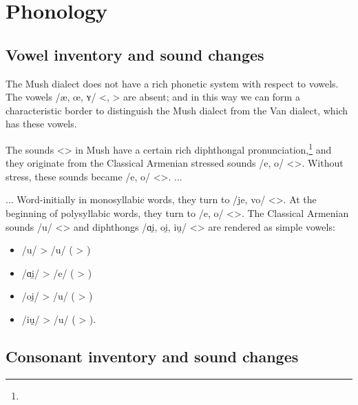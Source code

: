 
\section{Phonology}
\subsection{Vowel inventory and sound changes}\label{section:mush:phono:vowel}

The Mush dialect does not have a rich phonetic system with respect to vowels. The vowels /æ, œ, ʏ/ <, > are absent; and in this way we can form a characteristic border to distinguish the Mush dialect from the Van dialect, which has these vowels. 

The sounds <> in Mush have a certain rich diphthongal pronunciation,\footnote{} and they originate from the Classical Armenian stressed sounds /e, o/ <>. Without stress, these sounds became /e, o/ <>. ... 


\begin{adjarianpage}\label{page:117}\end{adjarianpage}%

... Word-initially in monosyllabic words, they turn to /je, vo/ <>. At the beginning of polysyllabic words, they turn to /e, o/ <>. The Classical Armenian sounds /u/ <> and diphthongs /ɑi̯, oi̯, iu̯/ <> are rendered as simple vowels:

\begin{itemize}
	\item /u/ > /u/ ( > ) 
	\item /ɑi̯/ > /e/ ( > )
	\item /oi̯/ > /u/ ( > )
	\item /iu̯/ > /u/ ( > ). 
\end{itemize}


\subsection{Consonant inventory and sound changes}

